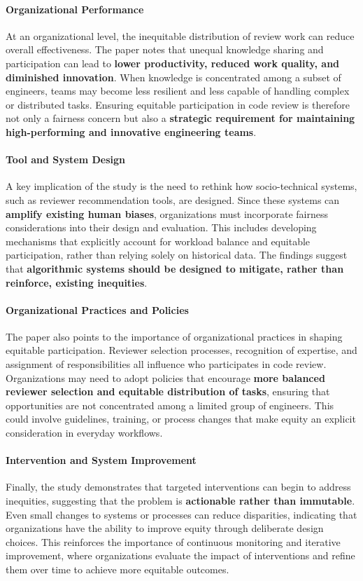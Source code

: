 \paragraph{Organizational Performance}
At an organizational level, the inequitable distribution of review work can reduce overall effectiveness. The paper notes that unequal knowledge sharing and participation can lead to \textbf{lower productivity, reduced work quality, and diminished innovation}. When knowledge is concentrated among a subset of engineers, teams may become less resilient and less capable of handling complex or distributed tasks. Ensuring equitable participation in code review is therefore not only a fairness concern but also a \textbf{strategic requirement for maintaining high-performing and innovative engineering teams}.

\paragraph{Tool and System Design}
A key implication of the study is the need to rethink how socio-technical systems, such as reviewer recommendation tools, are designed. Since these systems can \textbf{amplify existing human biases}, organizations must incorporate fairness considerations into their design and evaluation. This includes developing mechanisms that explicitly account for workload balance and equitable participation, rather than relying solely on historical data. The findings suggest that \textbf{algorithmic systems should be designed to mitigate, rather than reinforce, existing inequities}.

\paragraph{Organizational Practices and Policies}
The paper also points to the importance of organizational practices in shaping equitable participation. Reviewer selection processes, recognition of expertise, and assignment of responsibilities all influence who participates in code review. Organizations may need to adopt policies that encourage \textbf{more balanced reviewer selection and equitable distribution of tasks}, ensuring that opportunities are not concentrated among a limited group of engineers. This could involve guidelines, training, or process changes that make equity an explicit consideration in everyday workflows.

\paragraph{Intervention and System Improvement}
Finally, the study demonstrates that targeted interventions can begin to address inequities, suggesting that the problem is \textbf{actionable rather than immutable}. Even small changes to systems or processes can reduce disparities, indicating that organizations have the ability to improve equity through deliberate design choices. This reinforces the importance of continuous monitoring and iterative improvement, where organizations evaluate the impact of interventions and refine them over time to achieve more equitable outcomes.
